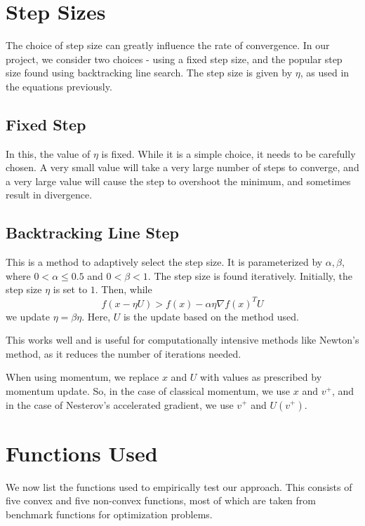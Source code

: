\documentclass{article}
\begin{document}
\section{Step Sizes}\label{step}
The choice of step size can greatly influence the rate of convergence. In our project, we consider two choices - using a fixed step size, and the popular step size found using backtracking line search. The step size is given by $\eta$, as used in the equations previously.

\subsection{Fixed Step}
In this, the value of $\eta$ is fixed. While it is a simple choice, it needs to be carefully chosen. A very small value will take a very large number of steps to converge, and a very large value will cause the step to overshoot the minimum, and sometimes result in divergence.

\subsection{Backtracking Line Step}
This is a method to adaptively select the step size. It is parameterized by $\alpha,\beta$, where $0<\alpha\le0.5$ and $0<\beta<1$. The step size is found iteratively. Initially, the step size $\eta$ is set to $1$. Then, while
\begin{equation}
f(x-\eta U) > f(x) - \alpha \eta \nabla f(x)^T U
\end{equation}
we update $\eta = \beta \eta$. Here, $U$ is the update based on the method used.

This works well and is useful for computationally intensive methods like Newton's method, as it reduces the number of iterations needed.

When using momentum, we replace $x$ and $U$ with values as prescribed by momentum update. So, in the case of classical momentum, we use $x$ and $v^+$, and in the case of Nesterov's accelerated gradient, we use $v^+$ and $U(v^+)$.

\section{Functions Used}\label{functions}
We now list the functions used to empirically test our approach. This consists of five convex and five non-convex functions, most of which are taken from benchmark functions for optimization problems.
\end{document}
